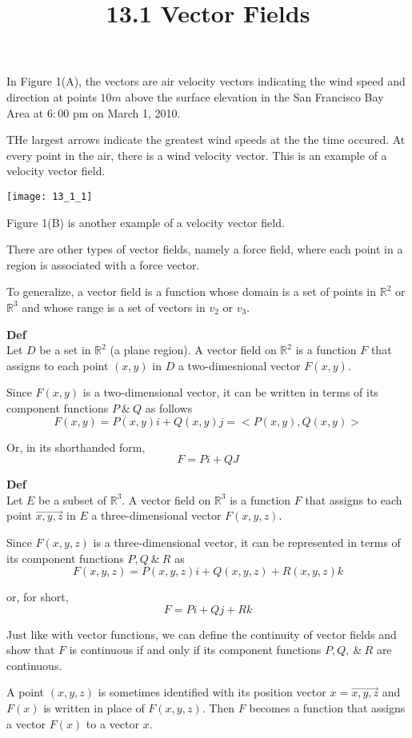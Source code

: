 \documentclass{article}
\title{13.1 Vector Fields}
\begin{document}
    \maketitle
    In Figure 1(A), the vectors are air velocity vectors indicating the wind speed and direction at points $ 10m $ above the surface elevation in the San Francisco Bay Area at $ 6:00 $ pm on March 1, 2010. 

    THe largest arrows indicate the greatest wind speeds at the the time occured. At every point in the air, there is a wind velocity vector. This is an example of a velocity vector field. 

    \begin{center}
        \texttt{[image: 13\_1\_1]}
    \end{center}

    Figure 1(B) is another example of a velocity vector field.

    There are other types of vector fields, namely a force field, where each point in a region is associated with a force vector.

    To generalize, a vector field is a function whose domain is a set of points in $ \mathbb{R}^{2} $ or $ \mathbb{R}^{3}  $ and whose range is a set of vectors in $ v_2 $ or $ v_3 $.

    \textbf{Def}\\
    Let $ D $ be a set in $ \mathbb{R}^{2} $ (a plane region). A vector field on $ \mathbb{R}^{2}  $ is a function $ F $ that assigns to each point $ (x,y) $ in $ D $ a two-dimesnional vector $ F(x,y) $.

  Since $ F(x,y) $ is a two-dimensional vector, it can be written in terms of its component functions $ P ~\&~ Q $ as follows
  \[
      F(x,y)=P(x,y)i+Q(x,y)j= <P(x,y), Q(x,y)> 
  \]

  Or, in its shorthanded form,
  \[
      F=Pi+QJ
  \]

  \textbf{Def}\\
  Let $ E $ be a subset of $ \mathbb{R}^{3} $. A vector field on $ \mathbb{R}^{3} $ is a function $ F $ that assigns to each point $ \vec{x,y,z} $ in $ E $ a three-dimensional vector $ F(x,y,z) $.

  Since $ F(x,y, z) $ is a three-dimensional vector, it can be represented in terms of its component functions $ P, Q ~\&~ R $ as
  \[
      F(x,y,z)=P(x,y,z)i+Q(x,y,z)+R(x,y,z)k
  \]

  or, for short,
  \[
      F=Pi+Qj+Rk
  \]
  
 Just like with vector functions, we can define the continuity of vector fields and show that $ F $ is continuous if and only if its component functions $ P, Q, ~\&~ R $ are continuous.

 A point $ (x,y,z) $ is sometimes identified with its position vector $ x=\vec{x,y,z} $ and $ F(x) $ is written in place of $ F(x,y,z) $. Then $ F $ becomes a function that assigns a vector $ F(x) $ to a vector $ x $. 
  
  
\end{document}
